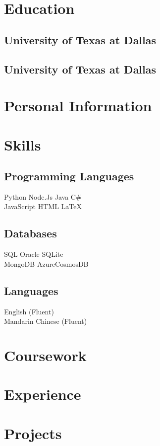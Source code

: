 \documentclass{fortythree_resume}
\begin{document}
\sectionsep

\begin{minipage}[t]{0.33\textwidth}

\section{Education}
\subsection{University of Texas at Dallas}
\subsection{University of Texas at Dallas}
\sectionsep

\section{Personal Information}
\sectionsep

\section{Skills}
\subsection{Programming Languages}
Python \textbullet{} Node.Js \textbullet{} Java \textbullet{} C\# \\
JavaScript \textbullet{} HTML \textbullet{} \LaTeX
\subsection{Databases}
SQL \textbullet{} Oracle \textbullet{} SQLite\\ 
MongoDB \textbullet{} AzureCosmosDB
\subsection{Languages}
English \hfill(Fluent)\\
Mandarin Chinese \hfill(Fluent)\\
\sectionsep

\section{Coursework}
\end{minipage}
\hfill
\begin{minipage}[t]{0.66\textwidth} 

\section{Experience}
\sectionsep

\section{Projects}
\sectionsep

\end{minipage}
\end{document}
